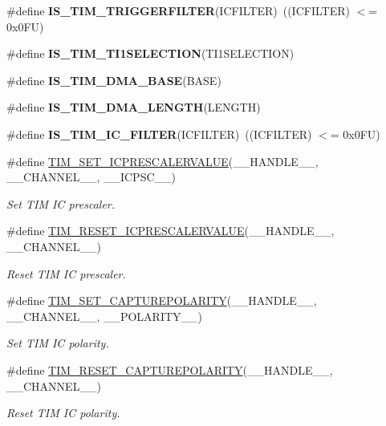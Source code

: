 \begin{DoxyCompactItemize}
\#define {\bfseries I\+S\+\_\+\+T\+I\+M\+\_\+\+T\+R\+I\+G\+G\+E\+R\+F\+I\+L\+T\+ER}(I\+C\+F\+I\+L\+T\+ER)~((I\+C\+F\+I\+L\+T\+ER) $<$= 0x0\+F\+U)
\item 
\#define {\bfseries I\+S\+\_\+\+T\+I\+M\+\_\+\+T\+I1\+S\+E\+L\+E\+C\+T\+I\+ON}(T\+I1\+S\+E\+L\+E\+C\+T\+I\+ON)
\item 
\#define {\bfseries I\+S\+\_\+\+T\+I\+M\+\_\+\+D\+M\+A\+\_\+\+B\+A\+SE}(B\+A\+SE)
\item 
\#define {\bfseries I\+S\+\_\+\+T\+I\+M\+\_\+\+D\+M\+A\+\_\+\+L\+E\+N\+G\+TH}(L\+E\+N\+G\+TH)
\item 
\mbox{\label{group___t_i_m___private___macros_ga19ecc5fc2e1ce1697c3dbbb9809ca243}} 
\#define {\bfseries I\+S\+\_\+\+T\+I\+M\+\_\+\+I\+C\+\_\+\+F\+I\+L\+T\+ER}(I\+C\+F\+I\+L\+T\+ER)~((I\+C\+F\+I\+L\+T\+ER) $<$= 0x0\+F\+U)
\item 
\#define \hyperlink{group___t_i_m___private___macros_ga99724157918ca8b4d8babee1d8008dcb}{T\+I\+M\+\_\+\+S\+E\+T\+\_\+\+I\+C\+P\+R\+E\+S\+C\+A\+L\+E\+R\+V\+A\+L\+UE}(\+\_\+\+\_\+\+H\+A\+N\+D\+L\+E\+\_\+\+\_\+,  \+\_\+\+\_\+\+C\+H\+A\+N\+N\+E\+L\+\_\+\+\_\+,  \+\_\+\+\_\+\+I\+C\+P\+S\+C\+\_\+\+\_\+)
\begin{DoxyCompactList}\small\item\em Set T\+IM IC prescaler. \end{DoxyCompactList}\item 
\#define \hyperlink{group___t_i_m___private___macros_ga18ded32faf42c8981c8d2970bb02e126}{T\+I\+M\+\_\+\+R\+E\+S\+E\+T\+\_\+\+I\+C\+P\+R\+E\+S\+C\+A\+L\+E\+R\+V\+A\+L\+UE}(\+\_\+\+\_\+\+H\+A\+N\+D\+L\+E\+\_\+\+\_\+,  \+\_\+\+\_\+\+C\+H\+A\+N\+N\+E\+L\+\_\+\+\_\+)
\begin{DoxyCompactList}\small\item\em Reset T\+IM IC prescaler. \end{DoxyCompactList}\item 
\#define \hyperlink{group___t_i_m___private___macros_ga4321d7371ca3a8c18f96e925667a7b2f}{T\+I\+M\+\_\+\+S\+E\+T\+\_\+\+C\+A\+P\+T\+U\+R\+E\+P\+O\+L\+A\+R\+I\+TY}(\+\_\+\+\_\+\+H\+A\+N\+D\+L\+E\+\_\+\+\_\+,  \+\_\+\+\_\+\+C\+H\+A\+N\+N\+E\+L\+\_\+\+\_\+,  \+\_\+\+\_\+\+P\+O\+L\+A\+R\+I\+T\+Y\+\_\+\+\_\+)
\begin{DoxyCompactList}\small\item\em Set T\+IM IC polarity. \end{DoxyCompactList}\item 
\#define \hyperlink{group___t_i_m___private___macros_gada7535acf7e1f9b3e8e1dcca848871db}{T\+I\+M\+\_\+\+R\+E\+S\+E\+T\+\_\+\+C\+A\+P\+T\+U\+R\+E\+P\+O\+L\+A\+R\+I\+TY}(\+\_\+\+\_\+\+H\+A\+N\+D\+L\+E\+\_\+\+\_\+,  \+\_\+\+\_\+\+C\+H\+A\+N\+N\+E\+L\+\_\+\+\_\+)
\begin{DoxyCompactList}\small\item\em Reset T\+IM IC polarity. \end{DoxyCompactList}\end{DoxyCompactItemize}


